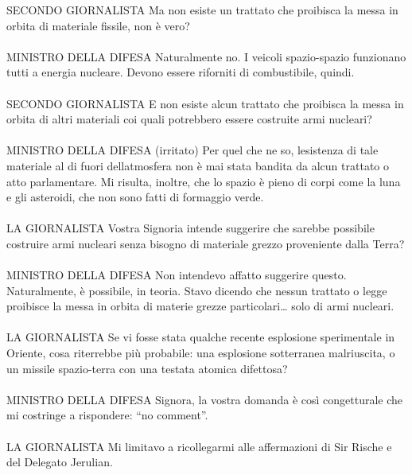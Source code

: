 {\begin{flushleft}
			SECONDO GIORNALISTA Ma non esiste un trattato che proibisca la messa in
			orbita di materiale fissile, non è vero?
			\leavevmode\\
			\leavevmode\\
			MINISTRO DELLA DIFESA Naturalmente no. I veicoli spazio-spazio
			funzionano tutti a energia nucleare. Devono essere riforniti di
			combustibile, quindi.
			\leavevmode\\
			\leavevmode\\
			SECONDO GIORNALISTA E non esiste alcun trattato che proibisca la messa
			in orbita di altri materiali coi quali potrebbero essere costruite armi
			nucleari?
			\leavevmode\\
			\leavevmode\\
			MINISTRO DELLA DIFESA (irritato) Per quel che ne so,
			l\textquotesingle esistenza di tale materiale al di fuori
			dell\textquotesingle atmosfera non è mai stata bandita da alcun trattato
			o atto parlamentare. Mi risulta, inoltre, che lo spazio è pieno di corpi
			come la luna e gli asteroidi, che non sono fatti di formaggio verde.
			\leavevmode\\
			\leavevmode\\
			LA GIORNALISTA Vostra Signoria intende suggerire che sarebbe possibile
			costruire armi nucleari senza bisogno di materiale grezzo proveniente
			dalla Terra?
			\leavevmode\\
			\leavevmode\\
			MINISTRO DELLA DIFESA Non intendevo affatto suggerire questo.
			Naturalmente, è possibile, in teoria. Stavo dicendo che nessun trattato
			o legge proibisce la messa in orbita di materie grezze
			particolari\ldots{} solo di armi nucleari.
			\leavevmode\\
			\leavevmode\\
			LA GIORNALISTA Se vi fosse stata qualche recente esplosione sperimentale
			in Oriente, cosa riterrebbe più probabile: una esplosione sotterranea
			malriuscita, o un missile spazio-terra con una testata atomica
			difettosa?
			\leavevmode\\
			\leavevmode\\
			MINISTRO DELLA DIFESA Signora, la vostra domanda è così congetturale che
			mi costringe a rispondere: ``no comment''.
			\leavevmode\\
			\leavevmode\\
			LA GIORNALISTA Mi limitavo a ricollegarmi alle affermazioni di Sir
			Rische e del Delegato Jerulian.
			\leavevmode\\

\end{flushleft}}
